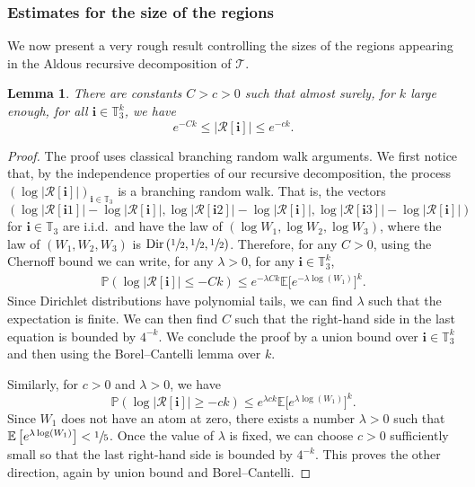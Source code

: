 \documentclass[JEP,XML,SOM,Unicode,NoFloatCountersInSection,published]{cedram}
\newcommand{\Ec}[1]{\mathbb{E} \left[#1\right]}
\newcommand{\bEc}[1]{\mathbb{E} \bigl[#1\bigr]}
\newcommand{\Pp}[1]{\mathbb{P} \left(#1\right)}
\newcommand{\Tt}{\mathcal{T}}
\newcommand{\Rr}{\mathcal{R}}
\newcommand{\ii}{\mathbf{i}}
\newcommand{\Dir}{\mathrm{Dir}}
\theoremstyle{plain}
\newtheorem{lemma}[theorem]{Lemma}
\theoremstyle{definition}
\begin{document}
\subsubsection*{Estimates for the size of the regions}
We now present a very rough result controlling the sizes of the regions appearing in the Aldous recursive decomposition of $\Tt$.
\begin{lemma}\label{lem:rough_control_size_regions}
There are constants $C>c>0$ such that almost surely, for $k$ large enough, for all $\ii \in \mathbb{T}_3^k$, we have
\[ e^{-Ck} \leq \left| \Rr[\ii ] \right| \leq e^{-ck}. \]
\end{lemma}

\begin{proof}
The proof uses classical branching random walk arguments.
We first notice that, by the independence properties of our recursive decomposition, the process $\left( \log \left| \Rr[\ii ] \right| \right)_{\ii \in \mathbb{T}_3}$ is a branching random walk.
That is, the vectors
\[ \left( \log \left| \Rr[\ii 1] \right|-\log \left| \Rr[\ii ] \right|, \log \left| \Rr[\ii 2] \right|-\log \left| \Rr[\ii ] \right|, \log \left| \Rr[\ii 3] \right|-\log \left| \Rr[\ii ] \right| \right) \]
for $\ii \in \mathbb{T}_3$ are i.i.d.\ and have the law of $\left( \log W_1, \log W_2, \log W_3 \right)$, where the law of $(W_1,W_2,W_3)$ is $\Dir \left( \sfrac{1}{2}, \sfrac{1}{2}, \sfrac{1}{2} \right)$.
Therefore, for any $C>0$, using the Chernoff bound we can write, for any $\lambda>0$, for any $\ii\in \mathbb{T}_3^k$,
\begin{align}\label{eq:chernoff inequality upper bound size regions}
\Pp{\log \left| \Rr[\ii ] \right| \leq -Ck} \leq e^{-\lambda C k} \bEc{e^{-\lambda \log(W_1)}}^k.
\end{align}
Since Dirichlet distributions have polynomial tails, we can find $\lambda$ such that the expectation is finite.
We can then find $C$ such that the right-hand side in the last equation is bounded by $4^{-k}$.
We conclude the proof by a union bound over $\ii \in \mathbb{T}_3^k$ and then using the Borel--Cantelli lemma over $k$.

Similarly, for $c>0$ and $\lambda>0$, we have
\[ \Pp{\log \left| \Rr[\ii ] \right| \geq -ck} \leq e^{\lambda c k} \bEc{e^{\lambda \log(W_1)}}^k. \]
Since $W_1$ does not have an atom at zero, there exists a number $\lambda>0$ such that $\Ec{e^{\lambda \log(W_1)}}<\sfrac{1}{5}$.
Once the value of $\lambda$ is fixed, we can choose $c>0$ sufficiently small so that the last right-hand side is bounded by $4^{-k}$.
This proves the other direction, again by union bound and Borel--Cantelli.
\end{proof}
\end{document}

